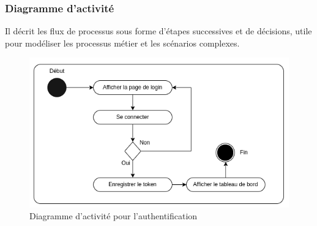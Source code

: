 \subsubsection{Diagramme d'activité}
Il décrit les flux de processus sous forme d'étapes successives et de décisions, utile pour modéliser les processus métier et les scénarios complexes.
\begin{figure}[H]
	\centering
	\includegraphics[width=16cm]{./img/composants/diagramme/auth.png}
	\caption{Diagramme d'activité pour l'authentification}
\end{figure}

